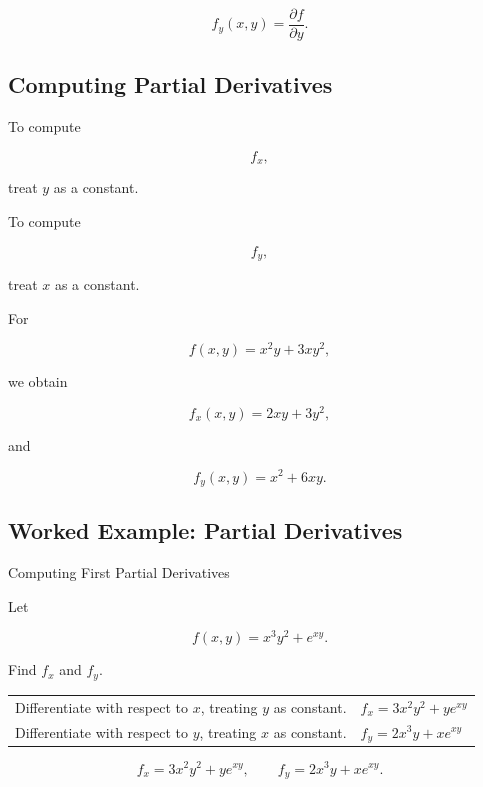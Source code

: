 \[ f_y(x,y)=\frac{\partial f}{\partial y}. \]

\subsection{Computing Partial Derivatives}
\label{subsec:computing-partials}

To compute

\[ f_x, \]

treat \(y\) as a constant.

To compute

\[ f_y, \]

treat \(x\) as a constant.

For

\[ f(x,y)=x^2y+3xy^2, \]

we obtain

\[ f_x(x,y)=2xy+3y^2, \]

and

\[ f_y(x,y)=x^2+6xy. \]

\subsection{Worked Example: Partial Derivatives}
\label{subsec:worked-partials}

\begin{workedexamplebox}{Computing First Partial Derivatives}

Let

\[ f(x,y)=x^3y^2+e^{xy}. \]

Find \(f_x\) and \(f_y\).

\begin{tabularx}{\textwidth}{@{}>{\raggedright\arraybackslash}p{}X@{}}
Differentiate with respect to \(x\), treating \(y\) as constant. &
\(f_x=3x^2y^2+ye^{xy}\)\\
Differentiate with respect to \(y\), treating \(x\) as constant. &
\(f_y=2x^3y+xe^{xy}\)
\end{tabularx}

\begin{answerbox}
\[ \boxed{f_x=3x^2y^2+ye^{xy},\qquad
f_y=2x^3y+xe^{xy}.} \]
\end{answerbox}
\end{workedexamplebox}

